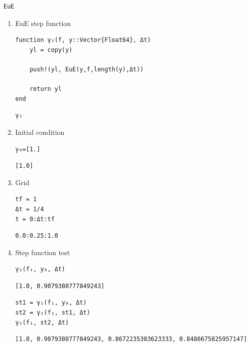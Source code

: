 \documentclass[11pt]{article}
\begin{document}
\begin{enumerate}
\begin{enumerate}
\begin{enumerate}
\begin{verbatim}
EuE
\end{verbatim}

\begin{enumerate}
\item EuE step function
\label{sec:org371a047}
\begin{verbatim}
function γ₁(f, y::Vector{Float64}, Δt)
    yl = copy(y)

    push!(yl, EuE(y,f,length(y),Δt))

    return yl
end
\end{verbatim}

\begin{verbatim}
γ₁
\end{verbatim}

\item Initial condition
\label{sec:org0da6ae2}
\begin{verbatim}
y₀=[1.]
\end{verbatim}

\begin{verbatim}
[1.0]
\end{verbatim}
\item Grid
\label{sec:org4bda126}
\begin{verbatim}
tf = 1
Δt = 1/4
t = 0:Δt:tf
\end{verbatim}

\begin{verbatim}
0.0:0.25:1.0
\end{verbatim}

\item Step function test
\label{sec:org6d8dc37}
\begin{verbatim}
γ₁(f₁, y₀, Δt)
\end{verbatim}

\begin{verbatim}
[1.0, 0.9079380777849243]
\end{verbatim}


\begin{verbatim}
st1 = γ₁(f₁, y₀, Δt)
st2 = γ₁(f₁, st1, Δt)
γ₁(f₁, st2, Δt)
\end{verbatim}

\begin{verbatim}
[1.0, 0.9079380777849243, 0.8672235383623333, 0.8486675825957147]
\end{verbatim}
\end{enumerate}


\end{enumerate}
\end{enumerate}
\end{enumerate}
\end{document}
